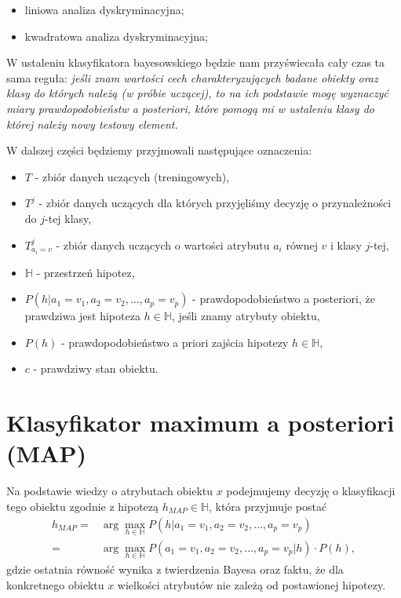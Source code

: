 \documentclass[
]{book}
\providecommand{\tightlist}{%
  \setlength{\itemsep}{0pt}\setlength{\parskip}{0pt}}
\theoremstyle{plain}
\theoremstyle{definition}
\theoremstyle{definition}
\theoremstyle{definition}
\theoremstyle{definition}
\theoremstyle{remark}
\begin{document}
\begin{itemize}
\tightlist
\item
  liniowa analiza dyskryminacyjna;
\item
  kwadratowa analiza dyskryminacyjna;
\end{itemize}

W ustaleniu klasyfikatora bayesowskiego będzie nam przyświecała cały czas ta sama reguła: \emph{jeśli znam wartości cech charakteryzujących badane obiekty oraz klasy do których należą (w próbie uczącej), to na ich podstawie mogę wyznaczyć miary prawdopodobieństw a posteriori, które pomogą mi w ustaleniu klasy do której należy nowy testowy element.}

W dalszej części będziemy przyjmowali następujące oznaczenia:

\begin{itemize}
\tightlist
\item
  \(T\) - zbiór danych uczących (treningowych),
\item
  \(T^j\) - zbiór danych uczących dla których przyjęliśmy decyzję o przynależności do \(j\)-tej klasy,
\item
  \(T^j_{a_i=v}\) - zbiór danych uczących o wartości atrybutu \(a_i\) równej \(v\) i klasy \(j\)-tej,
\item
  \(\mathbb{H}\) - przestrzeń hipotez,
\item
  \(P(h|a_1=v_1, a_2=v_2,\ldots,a_p=v_p)\) - prawdopodobieństwo a posteriori, że prawdziwa jest hipoteza \(h\in \mathbb{H}\), jeśli znamy atrybuty obiektu,
\item
  \(P(h)\) - prawdopodobieństwo a priori zajścia hipotezy \(h\in \mathbb{H}\),
\item
  \(c\) - prawdziwy stan obiektu.
\end{itemize}

\hypertarget{klasyfikator-maximum-a-posteriori-map}{%
\section{Klasyfikator maximum a posteriori (MAP)}\label{klasyfikator-maximum-a-posteriori-map}}

Na podstawie wiedzy o atrybutach obiektu \(x\) podejmujemy decyzję o klasyfikacji tego obiektu zgodnie z hipotezą \(h_{MAP}\in \mathbb{H}\), która przyjmuje postać
\begin{align}\label{MAP}
        h_{MAP}=&\operatorname{arg}\max_{h\in \mathbb{H}}P(h|a_1=v_1, a_2=v_2,\ldots,a_p=v_p)\\
            =& \operatorname{arg}\max_{h\in \mathbb{H}}P(a_1=v_1, a_2=v_2,\ldots,a_p=v_p|h)\cdot P(h),
\end{align}
gdzie ostatnia równość wynika z twierdzenia Bayesa oraz faktu, że dla konkretnego obiektu \(x\) wielkości atrybutów nie zależą od postawionej hipotezy.
\end{document}
